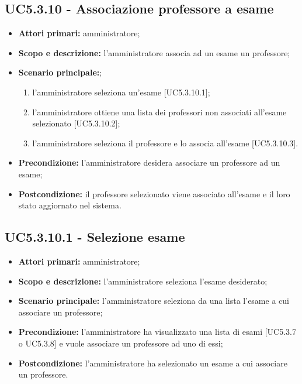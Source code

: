 \documentclass[AnalisiDeiRequisiti.tex]{subfiles}
\begin{document}
\subsection{UC5.3.10 - Associazione professore a esame}
\begin{itemize}
	\item \textbf{Attori primari:} amministratore;
	\item \textbf{Scopo e descrizione:} l'amministratore associa ad un esame un professore;
	\item \textbf{Scenario principale:};
	\begin{enumerate}
		\item l'amministratore seleziona un'esame [UC5.3.10.1];
		\item l'amministratore ottiene una lista dei professori non associati all'esame selezionato [UC5.3.10.2];
		\item l'amministratore seleziona il professore e lo associa all'esame [UC5.3.10.3].
	\end{enumerate}
	\item \textbf{Precondizione:} l'amministratore desidera associare un professore ad un esame; 
	\item \textbf{Postcondizione:} il professore selezionato viene associato all'esame e il loro stato aggiornato nel sistema.
\end{itemize}
\subsection{UC5.3.10.1 - Selezione esame}
\begin{itemize}
	\item \textbf{Attori primari:} amministratore;
	\item \textbf{Scopo e descrizione:} l'amministratore seleziona l'esame desiderato;
	\item \textbf{Scenario principale:} l'amministratore seleziona da una lista l'esame a cui associare un professore;
	\item \textbf{Precondizione:} l'amministratore ha visualizzato una lista di esami [UC5.3.7 o UC5.3.8] e vuole associare un professore ad uno di essi; 
	\item \textbf{Postcondizione:} l'amministratore ha selezionato un esame a cui associare un professore.
\end{itemize}
\end{document}
